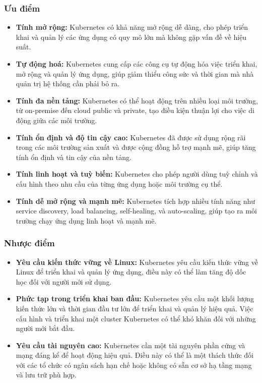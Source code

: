 \subsubsection{Ưu điểm}
\begin{itemize}
  \item \textbf{Tính mở rộng:} Kubernetes có khả năng mở rộng dễ dàng, cho phép triển khai và quản lý các ứng dụng có quy mô lớn mà không gặp vấn đề về hiệu suất.
  \item \textbf{Tự động hoá:} Kubernetes cung cấp các công cụ tự động hóa việc triển khai, mở rộng và quản lý ứng dụng, giúp giảm thiểu công sức và thời gian mà nhà quản trị hệ thống cần phải bỏ ra.
  \item \textbf{Tính đa nền tảng:} Kubernetes có thể hoạt động trên nhiều loại môi trường, từ on-premise đến cloud public và private, tạo điều kiện thuận lợi cho việc di động giữa các môi trường.
  \item \textbf{Tính ổn định và độ tin cậy cao:} Kubernetes đã được sử dụng rộng rãi trong các môi trường sản xuất và được cộng đồng hỗ trợ mạnh mẽ, giúp tăng tính ổn định và tin cậy của nền tảng.
  \item \textbf{Tính linh hoạt và tuỳ biến:} Kubernetes cho phép người dùng tuỳ chỉnh và cấu hình theo nhu cầu của từng ứng dụng hoặc môi trường cụ thể.
  \item \textbf{Tính dễ mở rộng và mạnh mẽ:} Kubernetes tích hợp nhiều tính năng như service discovery, load balancing, self-healing, và auto-scaling, giúp tạo ra môi trường chạy ứng dụng linh hoạt và mạnh mẽ.
\end{itemize}
\subsubsection{Nhược điểm}
\begin{itemize}
  \item \textbf{Yêu cầu kiến thức vững về Linux:} Kubernetes yêu cầu kiến thức vững về Linux để triển khai và quản lý ứng dụng, điều này có thể làm tăng độ dốc học đối với người mới sử dụng.
  \item \textbf{Phức tạp trong triển khai ban đầu:} Kubernetes yêu cầu một khối lượng kiến thức lớn và thời gian đầu tư lớn để triển khai và quản lý hiệu quả. Việc cấu hình và triển khai một cluster Kubernetes có thể khó khăn đối với những người mới bắt đầu.
  \item \textbf{Yêu cầu tài nguyên cao:} Kubernetes cần một tài nguyên phần cứng và mạng đáng kể để hoạt động hiệu quả. Điều này có thể là một thách thức đối với các tổ chức có ngân sách hạn chế hoặc không có sẵn cơ sở hạ tầng mạng và lưu trữ phù hợp.
\end{itemize}
